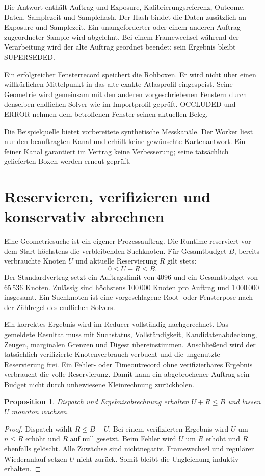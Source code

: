 \documentclass[11pt,a4paper]{article}
\newcommand{\nextsection}[2]{\clearpage{\color{accent}\small\textsf{#1}}\section{#2}}
\newtheorem{proposition}{Proposition}[section]
\begin{document}
Die Antwort enthält Auftrag und Exposure, Kalibrierungsreferenz,
Outcome, Daten, Samplezeit und Samplehash. Der Hash bindet die
Daten zusätzlich an Exposure und Samplezeit. Ein unangeforderter
oder einem anderen Auftrag zugeordneter Sample wird abgelehnt.
Bei einem Framewechsel während der Verarbeitung wird der alte
Auftrag geordnet beendet; sein Ergebnis bleibt SUPERSEDED.

Ein erfolgreicher Fensterrecord speichert die Rohboxen. Er wird
nicht über einen willkürlichen Mittelpunkt in das alte exakte
Atlasprofil eingespeist. Seine Geometrie wird gemeinsam mit den
anderen vorgeschriebenen Fenstern durch denselben endlichen
Solver wie im Importprofil geprüft. OCCLUDED und ERROR nehmen
dem betroffenen Fenster seinen aktuellen Beleg.

Die Beispielquelle bietet vorbereitete synthetische Messkanäle.
Der Worker liest nur den beauftragten Kanal und erhält keine
gewünschte Kartenantwort. Ein feiner Kanal garantiert im Vertrag
keine Verbesserung; seine tatsächlich gelieferten Boxen werden
erneut geprüft.

\nextsection{72 / SUCHBUDGET}{Reservieren, verifizieren und konservativ abrechnen}
Eine Geometriesuche ist ein eigener Prozessauftrag. Die Runtime
reserviert vor dem Start höchstens die verbleibenden Suchknoten.
Für Gesamtbudget $B$, bereits verbrauchte Knoten $U$ und aktuelle
Reservierung $R$ gilt stets:
\[
0\le U+R\le B.
\]
Der Standardvertrag setzt ein Auftragslimit von 4096 und ein
Gesamtbudget von 65\,536 Knoten. Zulässig sind höchstens
100\,000 Knoten pro Auftrag und 1\,000\,000 insgesamt.
Ein Suchknoten ist eine vorgeschlagene Root- oder Fensterpose
nach der Zählregel des endlichen Solvers.

Ein korrektes Ergebnis wird im Reducer vollständig nachgerechnet.
Das gemeldete Resultat muss mit Suchstatus, Vollständigkeit,
Kandidatenabdeckung, Zeugen, marginalen Grenzen und Digest
übereinstimmen. Anschließend wird der tatsächlich verifizierte
Knotenverbrauch verbucht und die ungenutzte Reservierung frei.
Ein Fehler- oder Timeoutrecord ohne verifizierbares Ergebnis
verbraucht die volle Reservierung. Damit kann ein abgebrochener
Auftrag sein Budget nicht durch unbewiesene Kleinrechnung
zurückholen.

\begin{proposition}
Dispatch und Ergebnisabrechnung erhalten $U+R\le B$ und lassen
$U$ monoton wachsen.
\end{proposition}
\begin{proof}
Dispatch wählt $R\le B-U$. Bei einem verifizierten Ergebnis wird
$U$ um $n\le R$ erhöht und $R$ auf null gesetzt. Beim Fehler wird
$U$ um $R$ erhöht und $R$ ebenfalls gelöscht. Alle Zuwächse sind
nichtnegativ. Framewechsel und regulärer Wiederanlauf setzen
$U$ nicht zurück. Somit bleibt die Ungleichung induktiv erhalten.
\end{proof}
\end{document}
